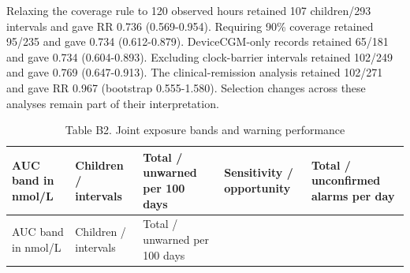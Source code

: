 \documentclass[
  american,
  11pt,
  letterpaper,
]{article}
\begin{document}
Relaxing the coverage rule to 120 observed hours retained 107
children/293 intervals and gave RR 0.736 (0.569-0.954). Requiring 90\%
coverage retained 95/235 and gave 0.734 (0.612-0.879). DeviceCGM-only
records retained 65/181 and gave 0.734 (0.604-0.893). Excluding
clock-barrier intervals retained 102/249 and gave 0.769 (0.647-0.913).
The clinical-remission analysis retained 102/271 and gave RR 0.967
(bootstrap 0.555-1.580). Selection changes across these analyses remain
part of their interpretation.

\Needspace{2.1in}
\begin{longtable}[]{@{}
  >{\raggedright\arraybackslash}p{}
  >{\raggedright\arraybackslash}p{}
  >{\raggedright\arraybackslash}p{}
  >{\raggedright\arraybackslash}p{}
  >{\raggedright\arraybackslash}p{}@{}}
\caption{Table B2. Joint exposure bands and warning
performance}\tabularnewline
\toprule\noalign{}
\begin{minipage}[b]{\linewidth}\raggedright
AUC band in nmol/L
\end{minipage} & \begin{minipage}[b]{\linewidth}\raggedright
Children / intervals
\end{minipage} & \begin{minipage}[b]{\linewidth}\raggedright
Total / unwarned per 100 days
\end{minipage} & \begin{minipage}[b]{\linewidth}\raggedright
Sensitivity / opportunity
\end{minipage} & \begin{minipage}[b]{\linewidth}\raggedright
Total / unconfirmed alarms per day
\end{minipage} \\
\midrule\noalign{}
\endfirsthead
\toprule\noalign{}
\begin{minipage}[b]{\linewidth}\raggedright
AUC band in nmol/L
\end{minipage} & \begin{minipage}[b]{\linewidth}\raggedright
Children / intervals
\end{minipage} & \begin{minipage}[b]{\linewidth}\raggedright
Total / unwarned per 100 days
\end{minipage} & \begin{minipage}[b]{\linewidth}\raggedright

\end{minipage}
\end{longtable}
\end{document}
